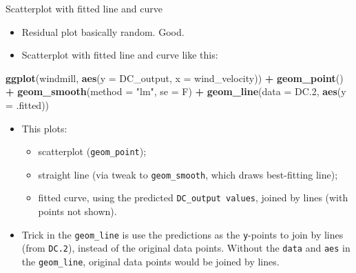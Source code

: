 \documentclass[ignorenonframetext,]{beamer}
\newenvironment{Shaded}{\begin{snugshade}}{\end{snugshade}}
\newcommand{\DataTypeTok}[1]{\textcolor[rgb]{0.13,0.29,0.53}{#1}}
\newcommand{\FloatTok}[1]{\textcolor[rgb]{0.00,0.00,0.81}{#1}}
\newcommand{\KeywordTok}[1]{\textcolor[rgb]{0.13,0.29,0.53}{\textbf{#1}}}
\newcommand{\NormalTok}[1]{#1}
\newcommand{\OperatorTok}[1]{\textcolor[rgb]{0.81,0.36,0.00}{\textbf{#1}}}
\newcommand{\StringTok}[1]{\textcolor[rgb]{0.31,0.60,0.02}{#1}}
\providecommand{\tightlist}{%
  \setlength{\itemsep}{0pt}\setlength{\parskip}{0pt}}
\begin{document}
\begin{frame}[fragile]{Scatterplot with fitted line and curve}
\protect\hypertarget{scatterplot-with-fitted-line-and-curve}{}

\begin{itemize}
\tightlist
\item
  Residual plot basically random. Good.
\item
  Scatterplot with fitted line and curve like this:
\end{itemize}

\begin{Shaded}
\begin{Highlighting}[]
\KeywordTok{ggplot}\NormalTok{(windmill, }\KeywordTok{aes}\NormalTok{(}\DataTypeTok{y =}\NormalTok{ DC_output, }\DataTypeTok{x =}\NormalTok{ wind_velocity)) }\OperatorTok{+}
\StringTok{  }\KeywordTok{geom_point}\NormalTok{() }\OperatorTok{+}\StringTok{ }\KeywordTok{geom_smooth}\NormalTok{(}\DataTypeTok{method =} \StringTok{"lm"}\NormalTok{, }\DataTypeTok{se =}\NormalTok{ F) }\OperatorTok{+}
\StringTok{  }\KeywordTok{geom_line}\NormalTok{(}\DataTypeTok{data =}\NormalTok{ DC}\FloatTok{.2}\NormalTok{, }\KeywordTok{aes}\NormalTok{(}\DataTypeTok{y =}\NormalTok{ .fitted))}
\end{Highlighting}
\end{Shaded}

\begin{itemize}
\tightlist
\item
  This plots:

  \begin{itemize}
  \tightlist
  \item
    scatterplot (\texttt{geom\_point});
  \item
    straight line (via tweak to \texttt{geom\_smooth}, which draws
    best-fitting line);
  \item
    fitted curve, using the predicted \texttt{DC\_output\ values},
    joined by lines (with points not shown).
  \end{itemize}
\item
  Trick in the \texttt{geom\_line} is use the predictions as the
  \texttt{y}-points to join by lines (from \texttt{DC.2}), instead of
  the original data points. Without the \texttt{data} and \texttt{aes}
  in the \texttt{geom\_line}, original data points would be joined by
  lines.
\end{itemize}

\end{frame}
\end{document}
